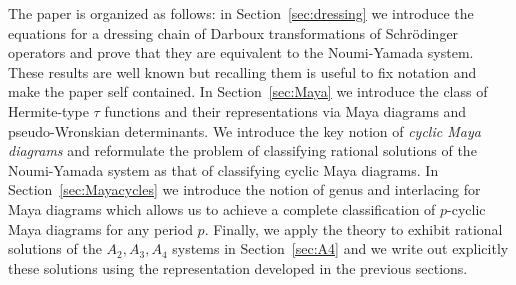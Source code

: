 \documentclass{amsart}
\theoremstyle{definition}
\newcommand{\Pfive}{{\rm P_{V}}}
\begin{document}
The paper is organized as follows: in Section~\ref{sec:dressing} we
introduce the equations for a dressing chain of Darboux
transformations of Schr\"odinger operators and prove that they are
equivalent to the Noumi-Yamada system. These results are well known
\cite{adler1994nonlinear} but recalling them is useful to fix notation
and make the paper self contained.  In Section~\ref{sec:Maya} we
introduce the class of Hermite-type $\tau$ functions and their
representations via Maya diagrams and pseudo-Wronskian
determinants. We introduce the key notion of \textit{cyclic Maya
  diagrams} and reformulate the problem of classifying rational
solutions of the Noumi-Yamada system as that of classifying cyclic
Maya diagrams. In Section~\ref{sec:Mayacycles} we introduce the notion
of genus and interlacing for Maya diagrams which allows us to achieve
a complete classification of $p$-cyclic Maya diagrams for any period
$p$. Finally, we apply the theory to exhibit rational solutions of the
$A_2, A_3, A_4$ systems in Section~\ref{sec:A4} and we write out
explicitly these solutions using the representation developed in the
previous sections.



\end{document}
